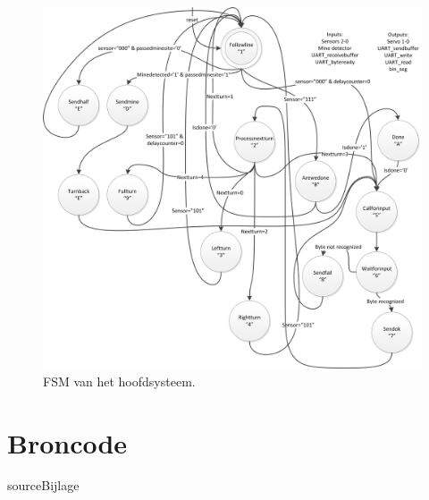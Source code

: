 \documentclass{report}
\begin{document}
\begin{appendices}
\begin{figure}[H]
\caption{FSM van het hoofdsysteem.}
\label{fig:fsmMain}
\includegraphics[width=0.8\linewidth]{FSMMain}
\end{figure}

\chapter{Broncode}
\label{app:source}
{sourceBijlage}
\end{appendices}
\end{document}
